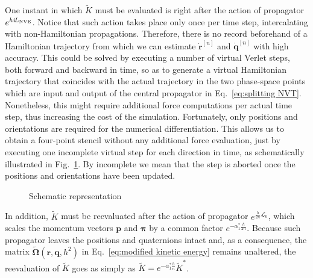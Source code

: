\documentclass[
journal=jctcce,
layout=twocolumn
]{achemso}
\newcommand{\vt}[1]{\boldsymbol{\mathbf{#1}}}   %
\newcommand{\Liu}[1]{i\!L_\text{#1}}            %
\newcommand{\timestep}{h}
\newcommand{\modified}[1]{\widetilde{#1}}
\begin{document}
One instant in which $\modified K$ must be evaluated is right after the action of propagator $e^{\timestep \Liu{\tiny NVE}}$.
Notice that such action takes place only once per time step, intercalating with non-Hamiltonian propagations.
Therefore, there is no record beforehand of a Hamiltonian trajectory from which we can estimate $\dot{\vt r}^{[n]}$ and $\dot{\vt q}^{[n]}$ with high accuracy.
This could be solved by executing a number of virtual Verlet steps, both forward and backward in time, so as to generate a virtual Hamiltonian trajectory that coincides with the actual trajectory in the two phase-space points which are input and output of the central propagator in Eq.~\eqref{eq:splitting NVT}.
Nonetheless, this might require additional force computations per actual time step, thus increasing the cost of the simulation.
Fortunately, only positions and orientations are required for the numerical differentiation.
This allows us to obtain a four-point stencil without any additional force evaluation, just by executing one incomplete virtual step for each direction in time, as schematically illustrated in Fig.~\ref{fig:virtual}.
By incomplete we mean that the step is aborted once the positions and orientations have been updated.
\begin{figure}
\caption{Schematic representation}
\label{fig:virtual}
\end{figure}

In addition, $\modified K$ must be reevaluated after the action of propagator $e^{\frac{\timestep}{2n} {\mathcal L}_0}$, which scales the momentum vectors $\vt p$ and $\vt \pi$ by a common factor $e^{-\alpha_1^\ast \frac{\timestep}{2n}}$.
Because such propagator leaves the positions and quaternions intact and, as a consequence, the matrix $\modified{\mathbf \Omega}(\vt r, \vt q, \timestep^2)$ in Eq.~\eqref{eq:modified kinetic energy} remains unaltered, the reevaluation of $\modified K$ goes as simply as ${\modified K} = e^{-\alpha_1^\ast \frac{\timestep}{n}} {\modified K}^\ast$.
\end{document}

